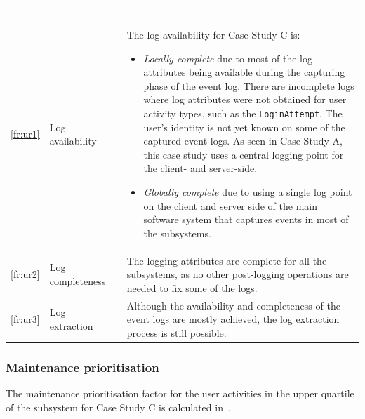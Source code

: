 \begin{xltabular}{\textwidth}{clcX}
	\caption[Logging quality assessment of Case Study C]{\textit{Logging quality assessment of Case Study C}}\label{tbl:ch3_caseCQuality}\\
	\toprule
	 &  &  &  \\
	\midrule
	\endfirsthead

	\caption[]{\continueCaption} \\
	\toprule
	 &  &  &  \\
	\midrule
	\endhead

	\midrule
	 \\ 
	\endfoot
	\endlastfoot

	\ref{fr:ur1} & Log availability & \cmark & \RaggedRight The log availability for Case Study C is: \begin{itemize}
			\item \textit{Locally complete} due to most of the log attributes being available during the capturing phase of the event log. There are incomplete logs where log attributes were not obtained for user activity types, such as the \texttt{LoginAttempt}. The user's identity is not yet known on some of the captured event logs. As seen in Case Study A, this case study uses a central logging point for the client- and server-side.
			\item \textit{Globally complete} due to using a single log point on the client and server side of the main software system that captures events in most of the subsystems. 
		\end{itemize} \\
	\ref{fr:ur2} & Log completeness & \cmark & The logging attributes are complete for all the subsystems, as no other post-logging operations are needed to fix some of the logs. \\
	\ref{fr:ur3} & Log extraction & \cmark & Although the availability and completeness of the event logs are mostly achieved, the log extraction process is still possible. \\
	\bottomrule
\end{xltabular}

\subsubsection{Maintenance prioritisation}
The maintenance prioritisation factor for the user activities in the upper quartile of the subsystem for Case Study C is calculated in~.

